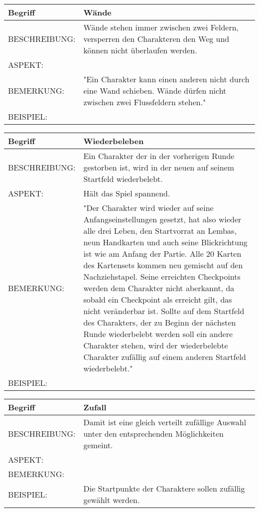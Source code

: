 \documentclass{uulm-assignment}
\begin{document}
	     \begin{tabularx}{\textwidth}{|l|X |} \hline
	        \textbf{Begriff} & \textbf{Wände} \\
	        \hline
	        BESCHREIBUNG: & Wände stehen immer zwischen zwei Feldern, versperren den Charakteren den Weg und können nicht überlaufen werden.  \\
	        \hline
	        ASPEKT: & 
	        \\
	        \hline
	        BEMERKUNG: & "Ein Charakter kann einen anderen nicht durch eine Wand schieben.
	        Wände dürfen nicht zwischen zwei Flussfeldern stehen." \\
	        \hline
	        BEISPIEL: & \\
	        \hline
	    \end{tabularx}

	     \begin{tabularx}{\textwidth}{|l|X |} \hline
	        \textbf{Begriff} & \textbf{Wiederbeleben } \\
	        \hline
	        BESCHREIBUNG: & Ein Charakter der in der vorherigen Runde gestorben ist, wird in der neuen auf seinem Startfeld wiederbelebt.  \\
	        \hline
	        ASPEKT: & Hält das Spiel spannend.
	        \\
	        \hline
	        BEMERKUNG: & "Der Charakter wird wieder auf seine Anfangseinstellungen gesetzt, hat also wieder alle drei Leben, den Startvorrat an Lembas, neun Handkarten und auch seine Blickrichtung ist wie am Anfang der Partie. Alle 20 Karten des Kartensets kommen neu gemischt auf den Nachziehstapel. Seine erreichten Checkpoints werden dem Charakter nicht aberkannt, da sobald ein Checkpoint als erreicht gilt, das nicht veränderbar ist.
	        Sollte auf dem Startfeld des Charakters, der zu Beginn der nächsten Runde wiederbelebt werden soll ein andere Charakter stehen, wird der wiederbelebte Charakter zufällig auf einem anderen Startfeld wiederbelebt." \\
	        \hline
	        BEISPIEL: & \\
	        \hline
	    \end{tabularx}

	     \begin{tabularx}{\textwidth}{|l|X |} \hline
	        \textbf{Begriff} & \textbf{Zufall} \\
	        \hline
	        BESCHREIBUNG: &  Damit ist eine gleich verteilt zufällige Auswahl unter den entsprechenden Möglichkeiten gemeint. \\
	        \hline
	        ASPEKT: & 
	        \\
	        \hline
	        BEMERKUNG: &  \\
	        \hline
	        BEISPIEL: & Die Startpunkte der Charaktere sollen zufällig gewählt werden. \\
	        \hline
	    \end{tabularx}
\end{document}

